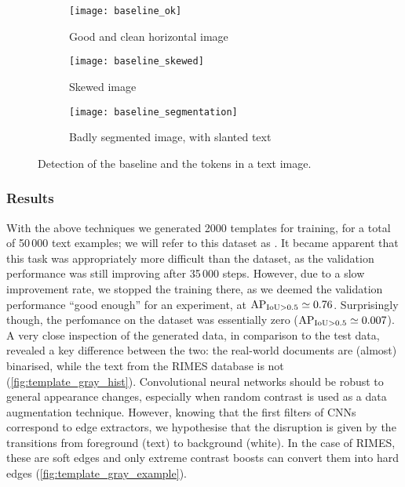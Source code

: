 			\begin{figure}[t]
				\begin{subfigure}{\linewidth}
					\texttt{[image: baseline\_ok]}
					\caption{Good and clean horizontal image}
					\label{fig:baseline_ok}
				\end{subfigure}

				\begin{subfigure}{\linewidth}
					\texttt{[image: baseline\_skewed]}
					\caption{Skewed image}
					\label{fig:baseline_skewed}
				\end{subfigure}

				\begin{subfigure}{\linewidth}
					\texttt{[image: baseline\_segmentation]}
					\caption{Badly segmented image, with slanted text}
					\label{fig:baseline_segmentation}
				\end{subfigure}
				\caption[Baseline and tokens]{Detection of the baseline and the tokens in a text image.}
				\label{fig:baseline}
			\end{figure}


		\subsubsection{Results}
		With the above techniques we generated 2000 templates for training, for a total of 50\,000 text examples; we will refer to this dataset as . It became apparent that this task was appropriately more difficult than the  dataset, as the validation performance was still improving after 35\,000 steps. However, due to a slow improvement rate, we stopped the training there, as we deemed the validation performance ``good enough'' for an experiment, at \(\operatorname{\operatorname{AP}_{\operatorname{IoU} > 0.5}} \simeq 0.76\). Surprisingly though, the perfomance on the  dataset was essentially zero (\(\operatorname{\operatorname{AP}_{\operatorname{IoU} > 0.5}} \simeq 0.007\)). A very close inspection of the generated data, in comparison to the test data, revealed a key difference between the two: the real-world documents are (almost) binarised, while the text from the RIMES database is not (\autoref{fig:template_gray_hist}). Convolutional neural networks should be robust to general appearance changes, especially when random contrast is used as a data augmentation technique. However, knowing that the first filters of CNNs correspond to edge extractors, we hypothesise that the disruption is given by the transitions from foreground (text) to background (white). In the case of RIMES, these are soft edges and only extreme contrast boosts can convert them into hard edges (\autoref{fig:template_gray_example}).


